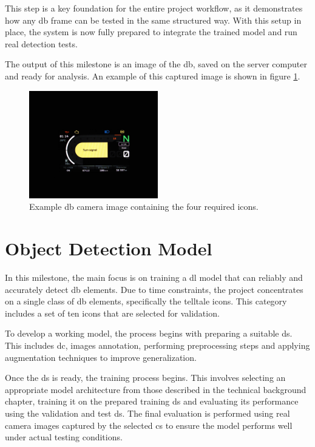 This step is a key foundation for the entire project workflow, as it demonstrates how any \gls{db} frame can be tested in the same structured way. With this setup in place, the system is now fully prepared to integrate the trained model and run real detection tests.

The output of this milestone is an image of the \gls{db}, saved on the server computer and ready for analysis. An example of this captured image is shown in figure \ref{DB_4_raw}.

\begin{figure}[!h]
    \centering
    \includegraphics[width=0.5\textwidth]{Figures/4.png}
    \caption{Example \gls{db} camera image containing the four required icons.}
    \label{DB_4_raw}
\end{figure}


\section{Object Detection Model}
In this milestone, the main focus is on training a \gls{dl} model that can reliably and accurately detect \gls{db} elements. Due to time constraints, the project concentrates on a single class of \gls{db} elements, specifically the telltale icons. This category includes a set of ten icons that are selected for validation.

To develop a working model, the process begins with preparing a suitable \gls{ds}. This includes \gls{dc}, images annotation, performing preprocessing steps and applying augmentation techniques to improve generalization.

Once the \gls{ds} is ready, the training process begins. This involves selecting an appropriate model architecture from those described in the technical background chapter, training it on the prepared training \gls{ds} and evaluating its performance using the validation and test \gls{ds}. The final evaluation is performed using real camera images captured by the selected \gls{cs} to ensure the model performs well under actual testing conditions.


